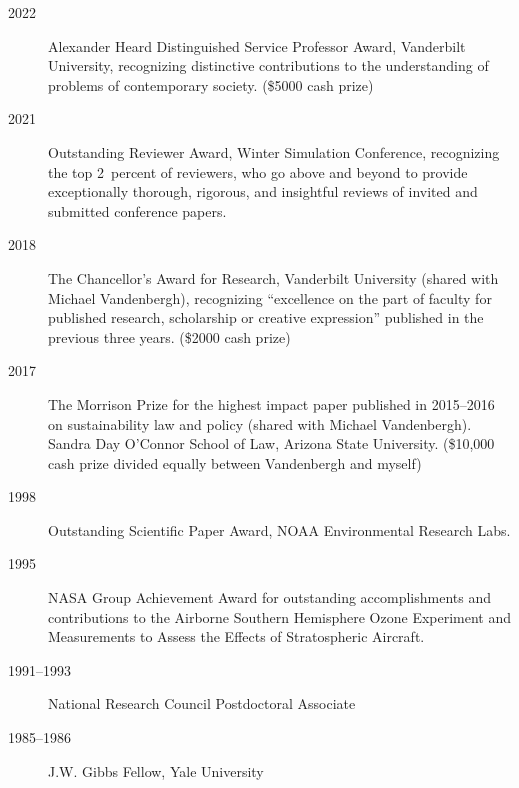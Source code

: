 \begin{description}
\item[2022] Alexander Heard Distinguished Service Professor Award,
  Vanderbilt University, recognizing distinctive contributions to the
  understanding of problems of contemporary society. (\$5000 cash prize)
\item[2021] Outstanding Reviewer Award, Winter Simulation Conference,
recognizing the top 2~percent of reviewers, who go above and beyond to provide
exceptionally thorough, rigorous, and insightful reviews of invited and
submitted conference papers.
\item[2018] The Chancellor's Award for Research, Vanderbilt University (shared
with Michael Vandenbergh), recognizing ``excellence on the part of faculty for
published research, scholarship or creative expression'' published in the
previous three years. (\$2000 cash prize)
\item[2017] The Morrison Prize for the highest impact paper published in
2015--2016 on sustainability law and policy (shared with Michael Vandenbergh).
Sandra Day O'Connor School of Law, Arizona State University. (\$10,000 cash
prize divided equally between Vandenbergh and myself)
\item[1998] Outstanding Scientific Paper Award, NOAA Environmental Research
Labs.
\item[1995] NASA Group Achievement Award for outstanding accomplishments and
contributions to the Airborne Southern Hemisphere Ozone Experiment and
Measurements to Assess the Effects of Stratospheric Aircraft.
\item[1991--1993] National Research Council Postdoctoral Associate
\item[1985--1986] J.W. Gibbs Fellow, Yale University
\end{description}
